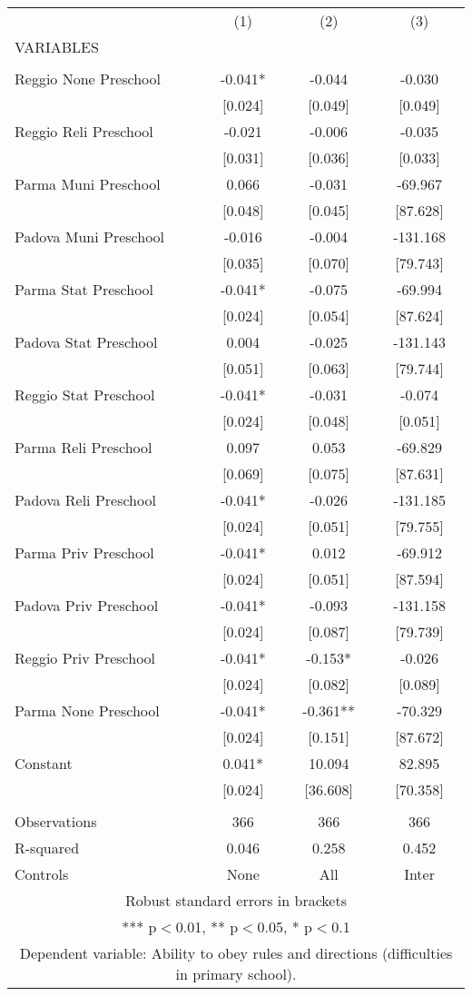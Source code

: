 \begin{tabular}{lccc} \hline
 & (1) & (2) & (3) \\
VARIABLES &  &  &  \\ \hline
 &  &  &  \\
Reggio None Preschool & -0.041* & -0.044 & -0.030 \\
 & [0.024] & [0.049] & [0.049] \\
Reggio Reli Preschool & -0.021 & -0.006 & -0.035 \\
 & [0.031] & [0.036] & [0.033] \\
Parma Muni Preschool & 0.066 & -0.031 & -69.967 \\
 & [0.048] & [0.045] & [87.628] \\
Padova Muni Preschool & -0.016 & -0.004 & -131.168 \\
 & [0.035] & [0.070] & [79.743] \\
Parma Stat Preschool & -0.041* & -0.075 & -69.994 \\
 & [0.024] & [0.054] & [87.624] \\
Padova Stat Preschool & 0.004 & -0.025 & -131.143 \\
 & [0.051] & [0.063] & [79.744] \\
Reggio Stat Preschool & -0.041* & -0.031 & -0.074 \\
 & [0.024] & [0.048] & [0.051] \\
Parma Reli Preschool & 0.097 & 0.053 & -69.829 \\
 & [0.069] & [0.075] & [87.631] \\
Padova Reli Preschool & -0.041* & -0.026 & -131.185 \\
 & [0.024] & [0.051] & [79.755] \\
Parma Priv Preschool & -0.041* & 0.012 & -69.912 \\
 & [0.024] & [0.051] & [87.594] \\
Padova Priv Preschool & -0.041* & -0.093 & -131.158 \\
 & [0.024] & [0.087] & [79.739] \\
Reggio Priv Preschool & -0.041* & -0.153* & -0.026 \\
 & [0.024] & [0.082] & [0.089] \\
Parma None Preschool & -0.041* & -0.361** & -70.329 \\
 & [0.024] & [0.151] & [87.672] \\
Constant & 0.041* & 10.094 & 82.895 \\
 & [0.024] & [36.608] & [70.358] \\
 &  &  &  \\
Observations & 366 & 366 & 366 \\
R-squared & 0.046 & 0.258 & 0.452 \\
 Controls & None & All & Inter \\ \hline
\multicolumn{4}{c}{ Robust standard errors in brackets} \\
\multicolumn{4}{c}{ *** p$<$0.01, ** p$<$0.05, * p$<$0.1} \\
\multicolumn{4}{c}{ Dependent variable: Ability to obey rules and directions (difficulties in primary school).} \\
\end{tabular}
